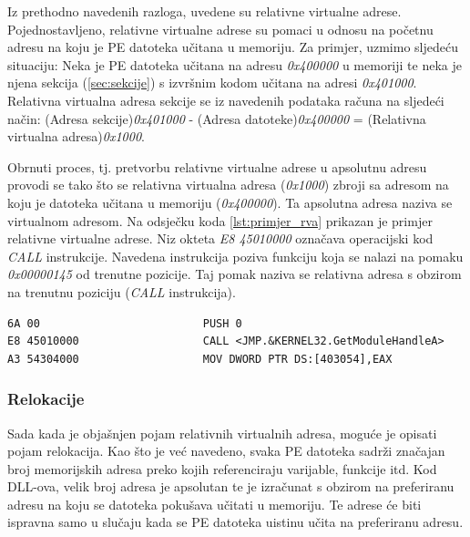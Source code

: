 \documentclass[times, utf8, diplomski, numeric]{fer}
\begin{document}
Iz prethodno navedenih razloga, uvedene su relativne virtualne
adrese. Pojednostavljeno, relativne virtualne adrese su pomaci u
odnosu na početnu adresu na koju je PE datoteka učitana u
memoriju. Za primjer, uzmimo sljedeću situaciju: Neka je PE
datoteka učitana na adresu \emph{0x400000} u memoriji te neka je
njena sekcija (\ref{sec:sekcije}) s izvršnim kodom učitana na				%
adresi \emph{0x401000}. Relativna virtualna adresa sekcije se iz
navedenih podataka računa na sljedeći način: (Adresa					%
sekcije)\emph{0x401000} - (Adresa datoteke)\emph{0x400000} =
(Relativna virtualna adresa)\emph{0x1000}.

Obrnuti proces, tj. pretvorbu relativne virtualne adrese u
apsolutnu adresu provodi se tako što se relativna virtualna
adresa (\emph{0x1000}) zbroji sa adresom na koju je datoteka
učitana u memoriju (\emph{0x400000}). Ta apsolutna adresa naziva			%
se virtualnom adresom. Na odsječku koda \ref{lst:primjer_rva}				%
prikazan je primjer relativne virtualne adrese. Niz okteta
\emph{E8 45010000} označava operacijski kod \emph{CALL}
instrukcije. Navedena instrukcija poziva funkciju koja se nalazi
na pomaku \emph{0x00000145} od trenutne pozicije. Taj pomak
naziva se relativna adresa s obzirom na trenutnu poziciju
(\emph{CALL} instrukcija). 

\begin{lstlisting}[frame=single, caption=Primjer relativne virtualne adrese, label={lst:primjer_rva}]
6A 00	                      PUSH 0
E8 45010000                   CALL <JMP.&KERNEL32.GetModuleHandleA>
A3 54304000                   MOV DWORD PTR DS:[403054],EAX
\end{lstlisting}

\subsubsection{Relokacije}

Sada kada je objašnjen pojam relativnih virtualnih adresa, moguće
je opisati pojam relokacija. Kao što je već navedeno, svaka PE
datoteka sadrži značajan broj memorijskih adresa preko kojih
referenciraju varijable, funkcije itd. Kod DLL-ova, velik broj				%
adresa je apsolutan te je izračunat s obzirom na preferiranu
adresu na koju se datoteka pokušava učitati u memoriju. Te adrese
će biti ispravna samo u slučaju kada se PE datoteka uistinu učita
na preferiranu adresu.
\end{document}
